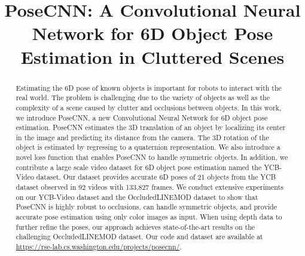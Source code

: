 \documentclass[conference]{IEEEtran}
\begin{document}
\title{PoseCNN: A Convolutional Neural Network for 6D Object Pose Estimation in Cluttered Scenes}



\author{
}











\maketitle

\begin{abstract}
	
Estimating the 6D pose of known objects is important for robots to interact with the real world. The problem is challenging due to the variety of objects as well as the complexity of a scene caused by clutter and occlusions between objects. In this work, we introduce PoseCNN, a new Convolutional Neural Network for 6D object pose estimation. PoseCNN estimates the 3D translation of an object by localizing its center in the image and predicting its distance from the camera. The 3D rotation of the object is estimated by regressing to a quaternion representation. We also introduce a novel loss function that enables PoseCNN to handle symmetric objects. In addition, we contribute a large scale video dataset for 6D object pose estimation named the YCB-Video dataset. Our dataset provides accurate 6D poses of 21 objects from the YCB dataset observed in 92 videos with 133,827 frames. We conduct extensive experiments on our YCB-Video dataset and the OccludedLINEMOD dataset to show that PoseCNN is highly robust to occlusions, can handle symmetric objects, and provide accurate pose estimation using only color images as input. When using depth data to further refine the poses, our approach achieves state-of-the-art results on the challenging OccludedLINEMOD dataset. Our code and dataset are available at \url{https://rse-lab.cs.washington.edu/projects/posecnn/}.

\end{abstract}

\IEEEpeerreviewmaketitle
\end{document}
